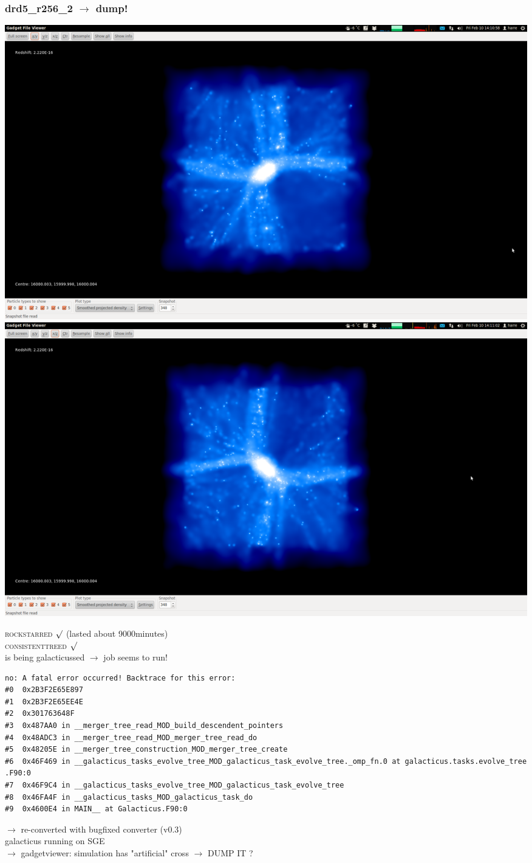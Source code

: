 \documentclass[a4paper,11pt,fleqn,oneside]{book}
\begin{document}
\newpage
\subsubsection{drd5\_r256\_2 $\rightarrow$ dump!} 

\includegraphics[scale=0.12]{drd5_r256_2/1.png} 
\includegraphics[scale=0.12]{drd5_r256_2/2.png} 

\textsc{rockstarred} $\surd$ (lasted about 9000minutes) \\
\textsc{consistenttreed} $\surd$ \\ 
is being galacticussed $\rightarrow$ job seems to run! \\
\begin{verbatim}
no: A fatal error occurred! Backtrace for this error:
#0  0x2B3F2E65E897
#1  0x2B3F2E65EE4E
#2  0x301763648F
#3  0x487AA0 in __merger_tree_read_MOD_build_descendent_pointers
#4  0x48ADC3 in __merger_tree_read_MOD_merger_tree_read_do
#5  0x48205E in __merger_tree_construction_MOD_merger_tree_create
#6  0x46F469 in __galacticus_tasks_evolve_tree_MOD_galacticus_task_evolve_tree._omp_fn.0 at galacticus.tasks.evolve_tree
.F90:0
#7  0x46F9C4 in __galacticus_tasks_evolve_tree_MOD_galacticus_task_evolve_tree
#8  0x46FA4F in __galacticus_tasks_MOD_galacticus_task_do
#9  0x4600E4 in MAIN__ at Galacticus.F90:0
\end{verbatim}
$\rightarrow$ re-converted with bugfixed converter (v0.3) \\
galacticus running on SGE \\
$\rightarrow$ gadgetviewer: simulation has "artificial" cross 
$\rightarrow$ DUMP IT ?
\end{document}

